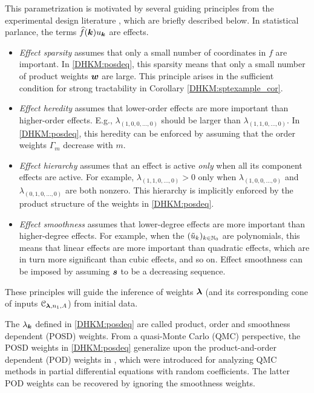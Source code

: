 \documentclass[USenglish]{article}
\theoremstyle{dgthm}
\theoremstyle{dgthm}
\theoremstyle{dgthm}
\theoremstyle{dgthm}
\theoremstyle{dgdef}
\theoremstyle{definition}
\newcommand{\DHKMhf}{\widehat{f}}
\newcommand{\DHKMtu}{\Tilde{u}}
\begin{document}
This parametrization is motivated by several guiding principles from the experimental design literature \citep{WuHam2009}, which are briefly described below.  In statistical parlance, the terms $\DHKMhf(\bsk) u_{\bsk}$ are effects.
\begin{itemize}
\item \emph{Effect sparsity} assumes that only a small number of coordinates in $f$ are important. In \eqref{DHKM:posdeq}, this sparsity means that only a small number of product weights ${\boldsymbol{w}}$ are large.  This principle arises in the sufficient condition for strong tractability in Corollary \ref{DHKM:sptexample_cor}.
\item \emph{Effect heredity} assumes that lower-order effects are more important than higher-order effects. E.g., $\lambda_{(1,0, 0,\ldots, 0)}$ should be larger than $\lambda_{(1, 1, 0, \ldots, 0)}$. In \eqref{DHKM:posdeq}, this heredity can be enforced by assuming that the order weights $\Gamma_{m}$ decrease with $m$. 
\item \emph{Effect hierarchy} assumes that an effect is active \emph{only} when all its component effects are active. For example, $\lambda_{(1, 1, 0, \ldots, 0)} > 0$ only when $\lambda_{(1, 0, 0, \ldots, 0)}$ and $\lambda_{(0, 1, 0, \ldots, 0)}$ are both nonzero. This hierarchy is implicitly enforced by the product structure of the weights in \eqref{DHKM:posdeq}.
\item \emph{Effect smoothness} assumes that lower-degree effects are more important than higher-degree effects. For example, when the $(\DHKMtu_k)_{k \in \mathbb{N}_0}$ are polynomials, this means that linear effects are more important than quadratic effects, which are in turn more significant than cubic effects, and so on. Effect smoothness can be imposed by assuming ${\boldsymbol{s}}$ to be a decreasing sequence. 
\end{itemize} 
\vspace{-3ex}
These principles will guide the inference of weights ${\boldsymbol{\lambda}}$ (and its corresponding cone of inputs ${\mathcal{C}}_{{\boldsymbol{\lambda}},n_1,A}$) from initial data.

\hspace{\parindent} The $\lambda_{{\boldsymbol{k}}}$ defined in \eqref{DHKM:posdeq} are called product, order and smoothness dependent (POSD) weights.  From a quasi-Monte Carlo (QMC) perspective, the POSD weights in \eqref{DHKM:posdeq} generalize upon the product-and-order dependent (POD) weights in \cite{KuoEtal12a}, which were introduced for analyzing QMC methods in partial differential equations with random coefficients. The latter POD weights can be recovered by ignoring the smoothness weights. 
\end{document}

